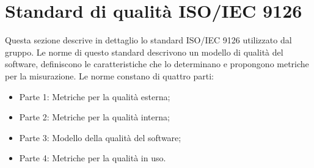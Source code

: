 \section{Standard di qualità ISO/IEC 9126}
Questa sezione descrive in dettaglio lo standard ISO/IEC 9126 utilizzato dal gruppo. Le norme di questo standard descrivono un modello di qualità del software, definiscono le caratteristiche che lo determinano e propongono metriche per la misurazione.
Le norme constano di quattro parti:
\begin{itemize}
\item Parte 1: Metriche per la qualità esterna;
\item Parte 2: Metriche per la qualità interna;
\item Parte 3: Modello della qualità del software;
\item Parte 4: Metriche per la qualità in uso.
\end{itemize}




